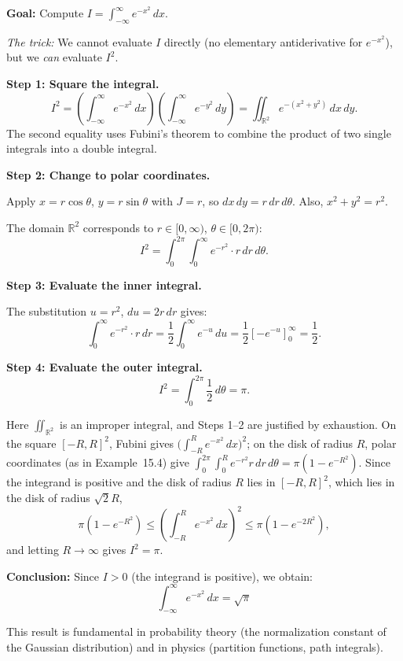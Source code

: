 \documentclass[11pt]{report}
\newcommand{\R}{\mathbb{R}}
\begin{document}
\begin{example}
\textbf{Goal:} Compute $I = \displaystyle\int_{-\infty}^{\infty} e^{-x^2} \, dx$.

\textit{The trick:} We cannot evaluate $I$ directly (no elementary antiderivative for $e^{-x^2}$), but we \textit{can} evaluate $I^2$.

\textbf{Step 1: Square the integral.}
\[
I^2 = \left( \int_{-\infty}^{\infty} e^{-x^2} \, dx \right)\left( \int_{-\infty}^{\infty} e^{-y^2} \, dy \right) = \iint_{\R^2} e^{-(x^2 + y^2)} \, dx \, dy.
\]
The second equality uses Fubini's theorem to combine the product of two single integrals into a double integral.

\textbf{Step 2: Change to polar coordinates.}

Apply $x = r\cos\theta$, $y = r\sin\theta$ with $J = r$, so $dx \, dy = r \, dr \, d\theta$. Also, $x^2 + y^2 = r^2$.

The domain $\R^2$ corresponds to $r \in [0, \infty)$, $\theta \in [0, 2\pi)$:
\[
I^2 = \int_0^{2\pi} \int_0^{\infty} e^{-r^2} \cdot r \, dr \, d\theta.
\]

\textbf{Step 3: Evaluate the inner integral.}

The substitution $u = r^2$, $du = 2r \, dr$ gives:
\[
\int_0^{\infty} e^{-r^2} \cdot r \, dr = \frac{1}{2} \int_0^{\infty} e^{-u} \, du = \frac{1}{2} \left[ -e^{-u} \right]_0^{\infty} = \frac{1}{2}.
\]

\textbf{Step 4: Evaluate the outer integral.}
\[
I^2 = \int_0^{2\pi} \frac{1}{2} \, d\theta = \pi.
\]

Here $\iint_{\R^2}$ is an improper integral, and Steps 1--2 are justified by exhaustion. On the square $[-R, R]^2$, Fubini gives $\big(\int_{-R}^{R} e^{-x^2}\, dx\big)^2$; on the disk of radius $R$, polar coordinates (as in Example~15.4) give $\int_0^{2\pi}\int_0^R e^{-r^2} r\, dr\, d\theta = \pi(1 - e^{-R^2})$. Since the integrand is positive and the disk of radius $R$ lies in $[-R, R]^2$, which lies in the disk of radius $\sqrt{2}R$,
\[
\pi(1 - e^{-R^2}) \leq \left( \int_{-R}^{R} e^{-x^2} \, dx \right)^2 \leq \pi(1 - e^{-2R^2}),
\]
and letting $R \to \infty$ gives $I^2 = \pi$.

\textbf{Conclusion:} Since $I > 0$ (the integrand is positive), we obtain:
\[
\boxed{\int_{-\infty}^{\infty} e^{-x^2} \, dx = \sqrt{\pi}}
\]

This result is fundamental in probability theory (the normalization constant of the Gaussian distribution) and in physics (partition functions, path integrals).
\end{example}
\end{document}
